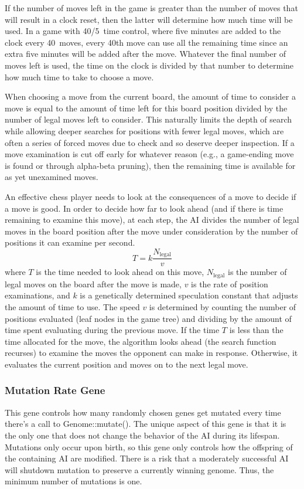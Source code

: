 \documentclass[letterpaper]{article}
\newcommand{\code}[1]{\small\textsf{#1}}
\renewcommand{\_}{\allowbreak\textunderscore\allowbreak}
\begin{document}
If the number of moves left in the game is greater than the number of moves that will result in a clock reset, then the latter will determine how much time will be used. In a game with 40/5~time control, where five minutes are added to the clock every 40~moves, every 40th move can use all the remaining time since an extra five minutes will be added after the move. Whatever the final number of moves left is used, the time on the clock is divided by that number to determine how much time to take to choose a move.

When choosing a move from the current board, the amount of time to consider a move is equal to the amount of time left for this board position divided by the number of legal moves left to consider. This naturally limits the depth of search while allowing deeper searches for positions with fewer legal moves, which are often a series of forced moves due to check and so deserve deeper inspection. If a move examination is cut off early for whatever reason (e.g., a game-ending move is found or through alpha-beta pruning), then the remaining time is available for as yet unexamined moves.

An effective chess player needs to look at the consequences of a move to decide if a move is good. In order to decide how far to look ahead (and if there is time remaining to examine this move), at each step, the AI divides the number of legal moves in the board position after the move under consideration by the number of positions it can examine per second.
\[
T = k\frac{N_{\textrm{legal}}}{v}
\]
where \(T\) is the time needed to look ahead on this move, \(N_{\textrm{legal}}\) is the number of legal moves on the board after the move is made, \(v\) is the rate of position examinations, and \(k\) is a genetically determined speculation constant that adjusts the amount of time to use. The speed \(v\) is determined by counting the number of positions evaluated (leaf nodes in the game tree) and dividing by the amount of time spent evaluating during the previous move. If the time \(T\) is less than the time allocated for the move, the algorithm looks ahead (the search function recurses) to examine the moves the opponent can make in response. Otherwise, it evaluates the current position and moves on to the next legal move.

\subsubsection{Mutation Rate Gene}\label{mutation-rate-gene}
This gene controls how many randomly chosen genes get mutated every time there's a call to \code{Genome::mutate()}. The unique aspect of this gene is that it is the only one that does not change the behavior of the AI during its lifespan. Mutations only occur upon birth, so this gene only controls how the offspring of the containing AI are modified. There is a risk that a moderately successful AI will shutdown mutation to preserve a currently winning genome. Thus, the minimum number of mutations is one.
\end{document}
